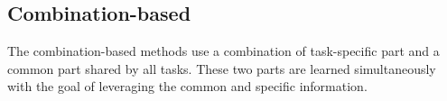 

\subsection{Combination-based}
The combination-based methods 
use a combination of task-specific part and a common part shared by all tasks. These two parts are learned simultaneously with the goal of leveraging the common and specific information.



